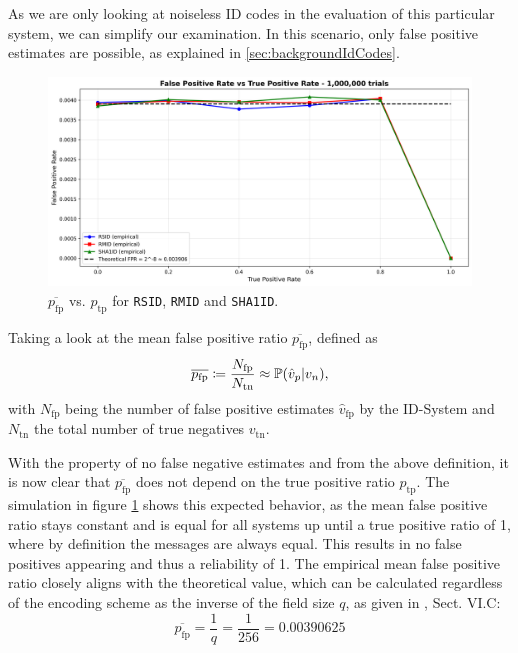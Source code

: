 \documentclass[english,BCOR=4mm,cdfont=false]{tudscrreprt} %
\begin{document}
As we are only looking at noiseless ID codes in the evaluation of this particular system, we can simplify our examination. In this scenario, only false positive estimates are possible, as explained in \ref{sec:backgroundIdCodes}.

\begin{figure}[h!]
    \centering
    \includegraphics[width=0.75\linewidth]{plots/fpr_comparison.png}
    \caption{$\overline{p_\text{fp}}$ vs. $p_\text{tp}$ for \texttt{RSID}, \texttt{RMID} and \texttt{SHA1ID}.}
    \label{fig:fpRate}
\end{figure}

Taking a look at the mean false positive ratio $\overline{p_\text{fp}}$, defined as
\begin{equation}
\overline{p_\text{fp}} \coloneq \frac{N_\text{fp}}{N_\text{tn}} \approx \mathbb{P}(\hat{v}_p | v_n),
\end{equation}
with $N_\text{fp}$ being the number of false positive estimates $\hat{v}_\text{fp}$ by the ID-System and $N_\text{tn}$ the total number of true negatives $v_\text{tn}$.

With the property of no false negative estimates and from the above definition, it is now clear that $\overline{p_\text{fp}}$ does not depend on the true positive ratio $p_\text{tp}$. The simulation in figure \ref{fig:fpRate} shows this expected behavior, as the mean false positive ratio stays constant and is equal for all systems up until a true positive ratio of 1, where by definition the messages are always equal. This results in no false positives appearing and thus a reliability of 1. The empirical mean false positive ratio closely aligns with the theoretical value, which can be calculated regardless of the encoding scheme as the inverse of the field size $q$, as given in \cite{Codes_for_ID_Tutorial}, Sect. VI.C:
\begin{equation}
    \overline{p_\text{fp}} = \frac{1}{q} = \frac{1}{256} = 0.00390625
\end{equation}
\end{document}

